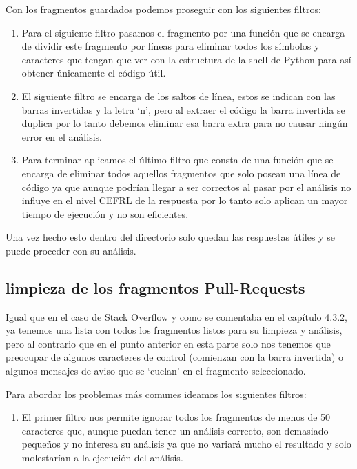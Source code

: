 \documentclass[a4paper, 12pt]{book}
\begin{document}
Con los fragmentos guardados podemos proseguir con los siguientes filtros:

\begin{enumerate}
	\item Para el siguiente filtro pasamos el fragmento por una función que se encarga de dividir este fragmento por líneas para eliminar todos los símbolos y caracteres que tengan que ver con la estructura de la shell de Python para así obtener únicamente el código útil.
	\item El siguiente filtro se encarga de los saltos de línea, estos se indican con las barras invertidas y la letra `n', pero al extraer el código la barra invertida se duplica por lo tanto debemos eliminar esa barra extra para no causar ningún error en el análisis.
	\item Para terminar aplicamos el último filtro que consta de una función que se encarga de eliminar todos aquellos fragmentos que solo posean una línea de código ya que aunque podrían llegar a ser correctos al pasar por el análisis no influye en el nivel CEFRL de la respuesta por lo tanto solo aplican un mayor tiempo de ejecución y no son eficientes.
\end{enumerate}

Una vez hecho esto dentro del directorio solo quedan las respuestas útiles y se puede proceder con su análisis.

\subsection{limpieza de los fragmentos Pull-Requests}

Igual que en el caso de Stack Overflow y como se comentaba en el capítulo 4.3.2, ya tenemos una lista con todos los fragmentos listos para su limpieza y análisis, pero al contrario que en el punto anterior en esta parte solo nos tenemos que preocupar de algunos caracteres de control (comienzan con la barra invertida) o algunos mensajes de aviso que se `cuelan' en el fragmento seleccionado.

Para abordar los problemas más comunes ideamos los siguientes filtros:

\begin{enumerate}
	\item El primer filtro nos permite ignorar todos los fragmentos de menos de 50 caracteres que, aunque puedan tener un análisis correcto, son demasiado pequeños y no interesa su análisis ya que no variará mucho el resultado y solo molestarían a la ejecución del análisis.
\end{enumerate}
\end{document}
